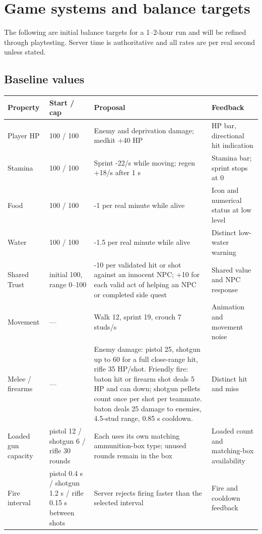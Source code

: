 \section{Game systems and balance targets}
The following are initial balance targets for a 1--2-hour run and will be refined through playtesting. Server time is authoritative and all rates are per real second unless stated.


\subsection{Baseline values}
\begin{longtable}{@{}p{}p{}p{}p{}@{}}
\toprule
\textbf{Property} & \textbf{Start / cap} & \textbf{Proposal} & \textbf{Feedback} \\ \midrule\endhead
Player HP & 100 / 100 & Enemy and deprivation damage; medkit +40 HP & HP bar, directional hit indication \\
Stamina & 100 / 100 & Sprint -22/s while moving; regen +18/s after 1 s & Stamina bar; sprint stops at 0 \\
Food & 100 / 100 & -1 per real minute while alive & Icon and numerical status at low level \\
Water & 100 / 100 & -1.5 per real minute while alive & Distinct low-water warning \\
Shared Trust & initial 100, range 0--100 & -10 per validated hit or shot against an innocent NPC; +10 for each valid act of helping an NPC or completed side quest & Shared value and NPC response \\
Movement & --- & Walk 12, sprint 19, crouch 7 studs/s & Animation and movement noise \\
Melee / firearms & --- & Enemy damage: pistol 25, shotgun up to 60 for a full close-range hit, rifle 35 HP/shot. Friendly fire: baton hit or firearm shot deals 5 HP and can down; shotgun pellets count once per shot per teammate. baton deals 25 damage to enemies, 4.5-stud range, 0.85 s cooldown. & Distinct hit and miss \\
Loaded gun capacity & pistol 12 / shotgun 6 / rifle 30 rounds & Each uses its own matching ammunition-box type; unused rounds remain in the box & Loaded count and matching-box availability \\
Fire interval & pistol 0.4 s / shotgun 1.2 s / rifle 0.15 s between shots & Server rejects firing faster than the selected interval & Fire and cooldown feedback \\

\end{longtable}
